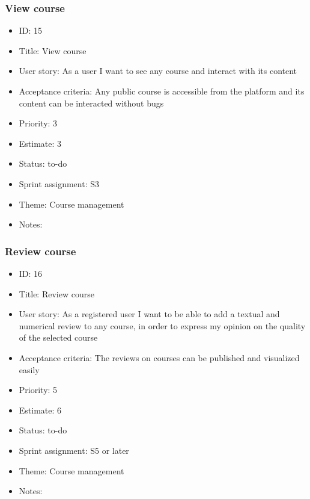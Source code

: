 \subsubsection{View course}
\begin{itemize}
	\item ID: 15
	\item Title: View course
	\item User story: As a user I want to see any course and interact with its content
	\item Acceptance criteria: Any public course is accessible from the platform and its content can be interacted without bugs
	\item Priority: 3
	\item Estimate: 3
	\item Status: to-do
	\item Sprint assignment: S3
	\item Theme: Course management
	\item Notes:
\end{itemize}

\subsubsection{Review course}
\begin{itemize}
	\item ID: 16
	\item Title: Review course
	\item User story: As a registered user I want to be able to add a textual and numerical review to any course, in order to express my opinion on the quality of the selected course
	\item Acceptance criteria: The reviews on courses can be published and visualized easily
	\item Priority: 5
	\item Estimate: 6
	\item Status: to-do
	\item Sprint assignment: S5 or later
	\item Theme: Course management
	\item Notes:
\end{itemize}

